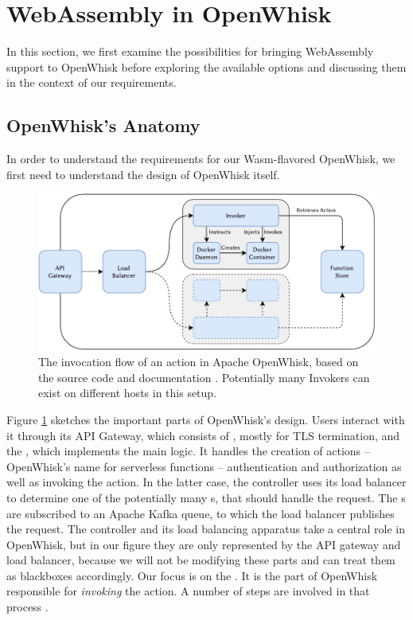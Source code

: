\section{WebAssembly in OpenWhisk}

In this section, we first examine the possibilities for bringing WebAssembly support to OpenWhisk before exploring the available options and discussing them in the context of our requirements.

\subsection{OpenWhisk's Anatomy}

In order to understand the requirements for our Wasm-flavored OpenWhisk, we first need to understand the design of OpenWhisk itself.

\begin{figure}[ht!]
    \centering
    \includegraphics[width=\textwidth]{figures/OpenWhiskActionInvocationFlow.pdf}
    \caption{The invocation flow of an action in Apache OpenWhisk, based on the source code and documentation \cite{OpenWhiskSystemDesign}. Potentially many Invokers can exist on different hosts in this setup.}
    \label{fig:openwhisk-action-invocation-flow}
\end{figure}

Figure \ref{fig:openwhisk-action-invocation-flow} sketches the important parts of OpenWhisk's design. Users interact with it through its API Gateway, which consists of , mostly for TLS termination, and the , which implements the main logic. It handles the creation of actions -- OpenWhisk's name for serverless functions -- authentication and authorization as well as invoking the action.
In the latter case, the controller uses its load balancer to determine one of the potentially many s, that should handle the request. The s are subscribed to an Apache Kafka queue, to which the load balancer publishes the request. The controller and its load balancing apparatus take a central role in OpenWhisk, but in our figure they are only represented by the API gateway and load balancer, because we will not be modifying these parts and can treat them as blackboxes accordingly.
Our focus is on the . It is the part of OpenWhisk responsible for \emph{invoking} the action. A number of steps are involved in that process \cite{OpenWhiskSystemDesign}.

